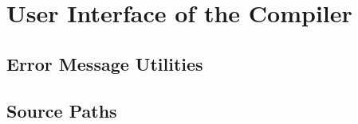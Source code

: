 \chapter{User Interface of the Compiler}

\section{Error Message Utilities}

\section{Source Paths}

